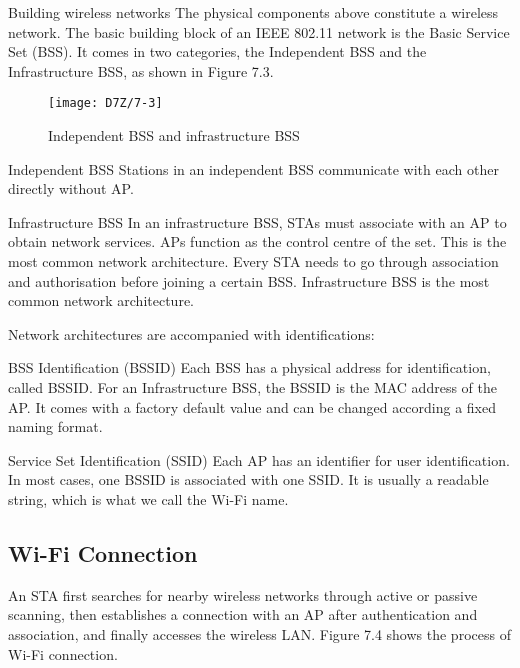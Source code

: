 \documentclass[a4paper,12pt]{book}
\begin{document}
\begin{term}{Building wireless networks}
    The physical components above constitute a wireless network. The basic building block of an IEEE 802.11 network is the Basic Service Set (BSS). It comes in two categories, the Independent BSS and the Infrastructure BSS, as shown in Figure 7.3.

    \begin{figure}[!h]
        \centering
        \texttt{[image: D7Z/7-3]}
        \caption{Independent BSS and infrastructure BSS}
    \end{figure}

    \parskip 6pt
    \begin{secterm}{Independent BSS}
        Stations in an independent BSS communicate with each other directly without AP.
    \end{secterm}

    \begin{secterm}{Infrastructure BSS}
        In an infrastructure BSS, STAs must associate with an AP to obtain network services. APs function as the control centre of the set. This is the most common network architecture. Every STA needs to go through association and authorisation before joining a certain BSS. Infrastructure BSS is the most common network architecture.
    \end{secterm}

    Network architectures are accompanied with identifications:

    \begin{secterm}{BSS Identification (BSSID)}
        Each BSS has a physical address for identification, called BSSID. For an Infrastructure BSS, the BSSID is the MAC address of the AP. It comes with a factory default value and can be changed according a fixed naming format.
    \end{secterm}

    \begin{secterm}{Service Set Identification (SSID)}
        Each AP has an identifier for user identification. In most cases, one BSSID is associated with one SSID. It is usually a readable string, which is what we call the Wi-Fi name.
    \end{secterm}
\end{term}

\subsection{Wi-Fi Connection}
An STA first searches for nearby wireless networks through active or passive scanning, then establishes a connection with an AP after authentication and association, and finally accesses the wireless LAN. Figure 7.4 shows the process of Wi-Fi connection.
\end{document}
